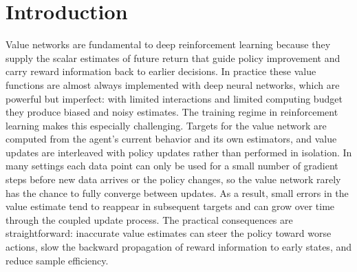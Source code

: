 
\begin{abstract}
Value-function approximation can be a major source of instability in deep reinforcement learning, as critic errors are repeatedly propagated through bootstrapped targets and policy updates. We study critic learning through the spectral dynamics of its weight matrices. While randomly initialized weights typically exhibit a Marchenko–Pastur-like spectral bulk, training can produce isolated singular values that reflect emerging low-rank structure. Motivated by this observation, we propose Spike Spectral Acceleration Regularization (SSAR), a critic regularizer that encourages the leading singular value to separate from the empirical bulk while limiting unnecessary growth of the remaining spectrum. The method is motivated by the Baik–Ben Arous–Péché transition, which connects spectral separation with non-vanishing alignment to an underlying signal direction. For a fixed-target critic update, we show that once the leading spike becomes supercritical, its spectral direction contributes a non-vanishing task-aligned descent component to the Bellman objective under explicit alignment and local regularity conditions. SSAR further uses a data-dependent stopping rule to remove the additional spike pressure after sufficient spectral separation. Experiments on continuous-control benchmarks show faster learning, lower variability across runs, and comparable or improved final returns relative to standard regularization baselines.

\end{abstract}






\section{Introduction}
\label{sec:intro}


Value networks are fundamental to deep reinforcement learning because they supply the scalar estimates of future return that guide policy improvement and carry reward information back to earlier decisions. In practice these value functions are almost always implemented with deep neural networks, which are powerful but imperfect: with limited interactions and limited computing budget they produce biased and noisy estimates. The training regime in reinforcement learning makes this especially challenging. Targets for the value network are computed from the agent's current behavior and its own estimators, and value updates are interleaved with policy updates rather than performed in isolation. In many settings each data point can only be used for a small number of gradient steps before new data arrives or the policy changes, so the value network rarely has the chance to fully converge between updates. As a result, small errors in the value estimate tend to reappear in subsequent targets and can grow over time through the coupled update process\cite{tang2024improving}. The practical consequences are straightforward: inaccurate value estimates can steer the policy toward worse actions, slow the backward propagation of reward information to early states, and reduce sample efficiency.

